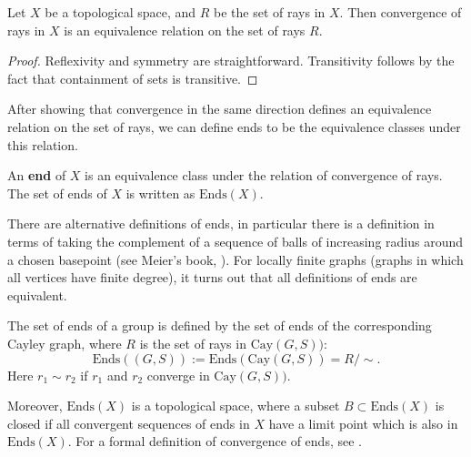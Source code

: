\begin{proposition}
    Let \(X\) be a topological space, and \(R\) be the set of rays in \(X\). Then convergence of rays in \(X\) is an equivalence relation on the set of rays \(R\).
\end{proposition}

\begin{proof}
    Reflexivity and symmetry are straightforward. Transitivity follows by the fact that containment of sets is transitive.
\end{proof}

After showing that convergence in the same direction defines an equivalence relation on the set of rays, we can define ends to be the equivalence classes under this relation.
\begin{definition}
\label{endsofgraph}
    An \textbf{end} of \(X\) is an equivalence class under the relation of convergence of rays. The set of ends of \(X\) is written as \(\mathrm{Ends}(X)\).
\end{definition}

\begin{remark}
    There are alternative definitions of ends, in particular there is a definition in terms of taking the complement of a sequence of balls of increasing radius around a chosen basepoint (see Meier's book, \cite[p.~208]{M08}). For locally finite graphs (graphs in which all vertices have finite degree), it turns out that all definitions of ends are equivalent.
\end{remark}

\begin{definition}
     The set of ends of a group is defined by the set of ends of the corresponding Cayley graph, where \(R\) is the set of rays in \(\mathrm{Cay}(G,S))\):
    \[
        \mathrm{Ends}((G,S)) := \mathrm{Ends}(\mathrm{Cay}(G,S)) = R/\sim.
    \]
    Here \(r_1 \sim r_2\) if \(r_1\) and \(r_2\) converge in \(\mathrm{Cay}(G,S))\).
\end{definition}

\begin{remark}
    Moreover, \(\mathrm{Ends}(X)\) is a topological space, where a subset \(B \subset \mathrm{Ends}(X)\) is closed if all convergent sequences of ends in \(X\) have a limit point which is also in \(\mathrm{Ends}(X)\). For a formal definition of convergence of ends, see \cite[p.~144]{bridson_haefliger_metric_1999}.
\end{remark}

